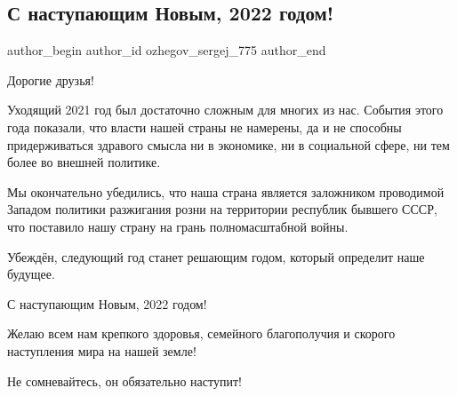  
 
 
 
 
 
\subsection{С наступающим Новым, 2022 годом!}
\label{sec:31_12_2021.fb.ozhegov_sergej_775.1.s_novym_godom}
 
\ifcmt
 author_begin
   author_id ozhegov_sergej_775
 author_end
\fi

Дорогие друзья!

Уходящий 2021 год был достаточно сложным для многих из нас. События этого года
показали, что власти нашей страны не намерены, да и не способны придерживаться
здравого смысла ни в экономике, ни в социальной сфере, ни тем более во внешней
политике.


Мы окончательно убедились, что наша страна является заложником проводимой
Западом политики разжигания розни на территории республик бывшего СССР, что
поставило нашу страну на грань полномасштабной войны.

Убеждён, следующий год станет решающим годом, который определит наше будущее.

С наступающим Новым, 2022 годом!

Желаю всем нам крепкого здоровья, семейного благополучия и скорого наступления
мира на нашей земле!

Не сомневайтесь, он обязательно наступит!
